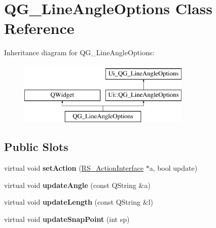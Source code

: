 \hypertarget{classQG__LineAngleOptions}{\section{Q\-G\-\_\-\-Line\-Angle\-Options Class Reference}
\label{classQG__LineAngleOptions}
}
Inheritance diagram for Q\-G\-\_\-\-Line\-Angle\-Options\-:\begin{figure}[H]
\begin{center}
\leavevmode
\includegraphics[height=3.000000cm]{classQG__LineAngleOptions}
\end{center}
\end{figure}
\subsection*{Public Slots}
\begin{DoxyCompactItemize}
\item 
\hypertarget{classQG__LineAngleOptions_af179dfff536fbb769dfc1a6c4b94c7c4}{virtual void {\bfseries set\-Action} (\hyperlink{classRS__ActionInterface}{R\-S\-\_\-\-Action\-Interface} $\ast$a, bool update)}\label{classQG__LineAngleOptions_af179dfff536fbb769dfc1a6c4b94c7c4}

\item 
\hypertarget{classQG__LineAngleOptions_a0ca773efefe13d63098abe88cc7c97eb}{virtual void {\bfseries update\-Angle} (const Q\-String \&a)}\label{classQG__LineAngleOptions_a0ca773efefe13d63098abe88cc7c97eb}

\item 
\hypertarget{classQG__LineAngleOptions_a7e11cff24ece8c4cd7e6e2de86bf433d}{virtual void {\bfseries update\-Length} (const Q\-String \&l)}\label{classQG__LineAngleOptions_a7e11cff24ece8c4cd7e6e2de86bf433d}

\item 
\hypertarget{classQG__LineAngleOptions_a0bfe057bbfd800bd477c1c676fbf06a1}{virtual void {\bfseries update\-Snap\-Point} (int sp)}\label{classQG__LineAngleOptions_a0bfe057bbfd800bd477c1c676fbf06a1}

\end{DoxyCompactItemize}
